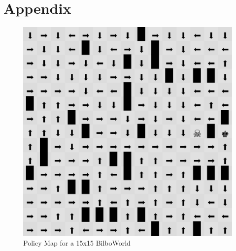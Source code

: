 \section{Appendix}
\begin{figure}[!h]
	\centering
	\includegraphics[width=\linewidth]{./figs/PolicyMap.png}
	\caption{Policy Map for a 15x15 BilboWorld}
\end{figure}
